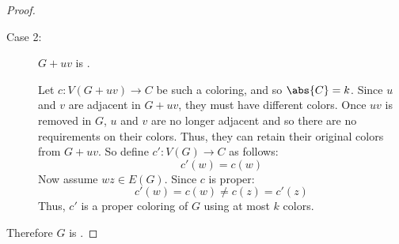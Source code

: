 \begin{proof}
\begin{description}
  \item [Case 2:] \(G+uv\) is .

    Let \(c:V(G+uv)\to C\) be such a coloring, and so \(\abs{C}=k\).  Since \(u\) and \(v\) are adjacent in
    \(G+uv\), they must have different colors.  Once \(uv\) is removed in \(G\), \(u\) and \(v\) are no longer
    adjacent and so there are no requirements on their colors.  Thus, they can retain their original colors from
    \(G+uv\).  So define \(c':V(G)\to C\) as follows:
    \[c'(w)=c(w)\]
    Now assume \(wz\in E(G)\).  Since \(c\) is proper:
    \[c'(w)=c(w)\ne c(z)=c'(z)\]
    Thus, \(c'\) is a proper coloring of \(G\) using at most \(k\) colors.
  \end{description}

  Therefore \(G\) is .
\end{proof}
